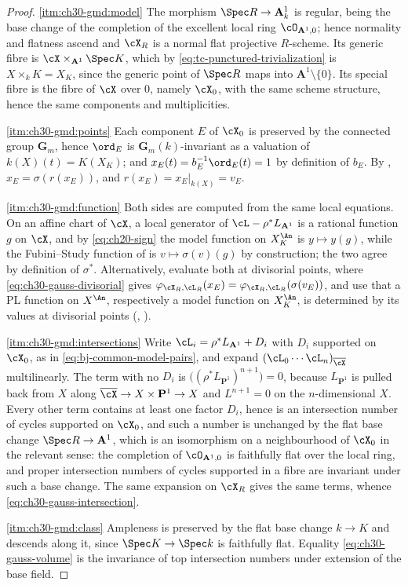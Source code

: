 \begin{proof}
\cref{itm:ch30-gmd:model}  The morphism \(\Spec R\to\mathbf A^1_k\) is
regular, being the base change of the completion of the excellent local ring
\(\cO_{\mathbf A^1,0}\); hence normality and flatness ascend and \(\cX_R\)
is a normal flat projective \(R\)-scheme.  Its generic fibre is
\(\cX\times_{\mathbf A^1}\Spec K\), which by
\eqref{eq:tc-punctured-trivialization} is \(X\times_kK=X_K\), since the
generic point of \(\Spec R\) maps into \(\mathbf A^1\setminus\{0\}\).  Its
special fibre is the fibre of \(\cX\) over \(0\), namely \(\cX_0\), with the
same scheme structure, hence the same components and multiplicities.

\cref{itm:ch30-gmd:points}  Each component \(E\) of \(\cX_0\) is preserved by
the connected group \(\mathbf G_m\), hence \(\ord_E\) is
\(\mathbf G_m(k)\)-invariant as a valuation of \(k(X)(t)=K(X_K)\); and
\(x_E(t)=b_E^{-1}\ord_E(t)=1\) by definition of \(b_E\).  By
, \(x_E=\sigma(r(x_E))\), and
\(r(x_E)=x_E|_{k(X)}=v_E\).

\cref{itm:ch30-gmd:function}  Both sides are computed from the same local
equations.  On an affine chart of \(\cX\), a local generator of
\(\cL-\rho^*L_{\mathbf A^1}\) is a rational function \(g\) on \(\cX\), and
by \eqref{eq:ch20-sign} the model function on \(X_K^{\An}\) is
\(y\mapsto y(g)\), while the Fubini--Study function of
 is \(v\mapsto\sigma(v)(g)\) by construction; the
two agree by definition of \(\sigma^*\).  Alternatively, evaluate both at
divisorial points, where \eqref{eq:ch30-gauss-divisorial} gives
\(\varphi_{\cX_R,\cL_R}(x_E)=\varphi_{\cX_R,\cL_R}(\sigma(v_E))\), and use
that a PL function on \(X^{\An}\), respectively a model function on
\(X_K^{\An}\), is determined by its values at divisorial points
(, ).

\cref{itm:ch30-gmd:intersections}  Write
\(\cL_i=\rho^*L_{\mathbf A^1}+D_i\) with \(D_i\) supported on \(\cX_0\), as
in \eqref{eq:bj-common-model-pairs}, and expand
\((\cL_0\cdots\cL_n)_{\overline\cX}\) multilinearly.  The term with no
\(D_i\) is \(\bigl((\rho^*L_{\mathbf P^1})^{n+1}\bigr)=0\), because
\(L_{\mathbf P^1}\) is pulled back from \(X\) along
\(\overline\cX\to X\times\mathbf P^1\to X\) and \(L^{n+1}=0\) on the
\(n\)-dimensional \(X\).  Every other term contains at least one factor
\(D_i\), hence is an intersection number of cycles supported on \(\cX_0\),
and such a number is unchanged by the flat base change
\(\Spec R\to\mathbf A^1\), which is an isomorphism on a neighbourhood of
\(\cX_0\) in the relevant sense: the completion of \(\cO_{\mathbf A^1,0}\)
is faithfully flat over the local ring, and proper intersection numbers of
cycles supported in a fibre are invariant under such a base change.  The
same expansion on \(\cX_R\) gives the same terms, whence
\eqref{eq:ch30-gauss-intersection}.

\cref{itm:ch30-gmd:class}  Ampleness is preserved by the flat base change
\(k\to K\) and descends along it, since \(\Spec K\to\Spec k\) is faithfully
flat.  Equality \eqref{eq:ch30-gauss-volume} is the invariance of top
intersection numbers under extension of the base field.
\end{proof}
